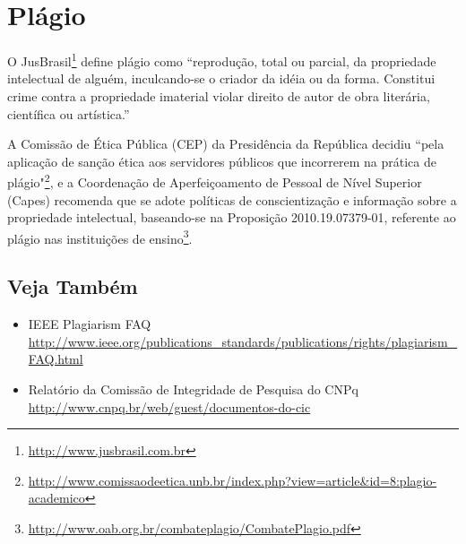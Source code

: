 \section{Plágio}%
O JusBrasil\footnote{\url{http://www.jusbrasil.com.br}} define plágio como 
``reprodução, total ou parcial, da propriedade intelectual de alguém, inculcando-se 
o criador da idéia ou da forma. Constitui crime contra a propriedade imaterial 
violar direito de autor de obra literária, científica ou artística.''


A Comissão de Ética Pública (CEP) da Presidência da República decidiu  ``pela 
aplicação de sanção ética aos servidores públicos que incorrerem na prática de 
plágio"\footnote{\url{http://www.comissaodeetica.unb.br/index.php?view=article&id=8:plagio-academico}}, 
e a Coordenação de Aperfeiçoamento de Pessoal de Nível Superior (Capes) recomenda
que se adote políticas de conscientização e informação sobre a propriedade 
intelectual, baseando-se na Proposição 2010.19.07379-01, referente ao plágio nas 
instituições de ensino\footnote{\url{http://www.oab.org.br/combateplagio/CombatePlagio.pdf}}.


\subsection{Veja Também}
\begin{itemize}
	\item IEEE Plagiarism FAQ
		\\\url{http://www.ieee.org/publications_standards/publications/rights/plagiarism_FAQ.html}
	\item Relatório da Comissão de Integridade de Pesquisa do CNPq
		\\\url{http://www.cnpq.br/web/guest/documentos-do-cic}
\end{itemize}




